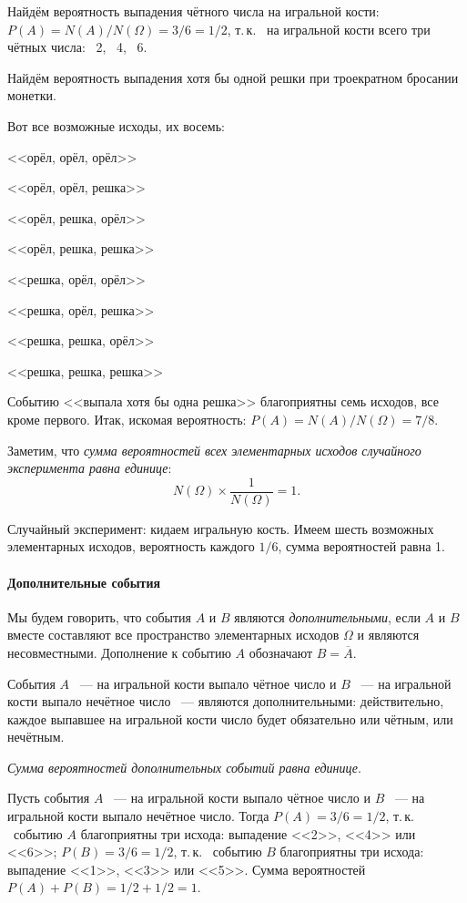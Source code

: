 \documentclass[11pt]{article}
\begin{document}
\begin{examples}
	\item Найдём вероятность выпадения чётного числа на игральной кости: $P(A)=N(A)/N(\Omega)=3/6=1/2$, т.\,к. ~на игральной кости всего три чётных числа: ~2, ~4, ~6.

	\item Найдём вероятность выпадения хотя бы одной решки при троекратном бросании монетки.

Вот все возможные исходы, их восемь:

   <<орёл, орёл, орёл>>

   <<орёл, орёл, решка>>

   <<орёл, решка, орёл>>

   <<орёл, решка, решка>>

   <<решка, орёл, орёл>>

   <<решка, орёл, решка>>

   <<решка, решка, орёл>>

   <<решка, решка, решка>>

Событию <<выпала хотя бы одна решка>> благоприятны семь исходов, все кроме первого. Итак, искомая вероятность:
$P(A)=N(A)/N(\Omega)=7/8$.
\end{examples}

Заметим, что \emph{сумма вероятностей всех элементарных исходов случайного эксперимента равна единице}:
$$
	N(\Omega)\times\frac{1}{N(\Omega)}=1.
$$

\begin{example}
Случайный эксперимент: кидаем игральную кость. Имеем шесть возможных элементарных исходов, вероятность каждого $1/6$, сумма вероятностей равна 1.
\end{example}

\paragraph{Дополнительные события} Мы будем говорить, что события $A$ и $B$ являются \emph{дополнительными}, если $A$ и $B$ вместе составляют все пространство элементарных исходов $\Omega$ и являются несовместными. Дополнение к событию $A$ обозначают $B=\overline{A}$.

\begin{example}
	События $A$ ~--- на игральной кости выпало чётное число  и $B$ ~--- на игральной кости выпало нечётное число ~--- являются дополнительными: действительно, каждое выпавшее на игральной кости число будет обязательно или чётным, или нечётным.
\end{example}

\emph{Сумма вероятностей дополнительных событий равна единице}.
\begin{examples}
   \item Пусть события $A$ ~--- на игральной кости выпало чётное число и $B$ ~--- на игральной кости выпало нечётное число. Тогда $P(A)=3/6=1/2$, т.\,к. ~событию $A$ благоприятны три исхода: выпадение <<2>>, <<4>> или <<6>>; $P(B)=3/6=1/2$, т.\,к. ~событию $B$ благоприятны три исхода: выпадение <<1>>, <<3>> или <<5>>. Сумма вероятностей $P(A)+P(B)=1/2+1/2=1$.

\end{examples}
\end{document}
